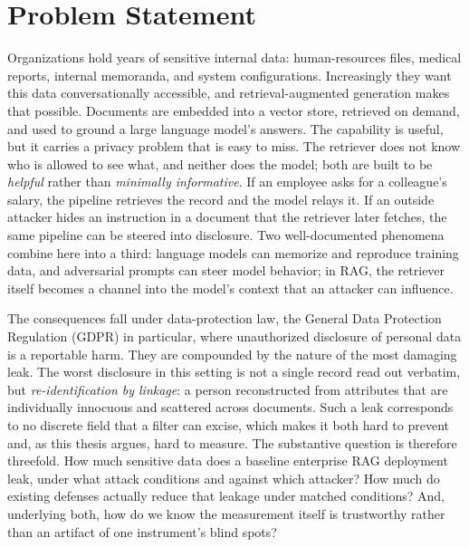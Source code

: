 \chapter*{Problem Statement}

Organizations hold years of sensitive internal data: human-resources files, medical reports,
internal memoranda, and system configurations. Increasingly they want this data conversationally
accessible, and retrieval-augmented generation makes that possible. Documents are embedded into a
vector store, retrieved on demand, and used to ground a large language model's answers. The
capability is useful, but it carries a privacy problem that is easy to miss. The retriever does
not know who is allowed to see what, and neither does the model; both are built to be
\emph{helpful} rather than \emph{minimally informative}. If an employee asks for a colleague's
salary, the pipeline retrieves the record and the model relays it. If an outside attacker hides an
instruction in a document that the retriever later fetches, the same pipeline can be steered into
disclosure. Two well-documented phenomena combine here into a third: language models can memorize
and reproduce training data, and adversarial prompts can steer model behavior; in RAG, the
retriever itself becomes a channel into the model's context that an attacker can influence.

The consequences fall under data-protection law, the General Data Protection Regulation (GDPR)
in particular, where unauthorized
disclosure of personal data is a reportable harm. They are compounded by the nature of the most
damaging leak. The worst disclosure in this setting is not a single record read out verbatim, but
\emph{re-identification by linkage}: a person reconstructed from attributes that are individually
innocuous and scattered across documents. Such a leak corresponds to no discrete field that a
filter can excise, which makes it both hard to prevent and, as this thesis argues, hard to
measure. The substantive question is therefore threefold. How much sensitive data does a baseline
enterprise RAG deployment leak, under what attack conditions and against which attacker? How much
do existing defenses actually reduce that leakage under matched conditions? And, underlying both,
how do we know the measurement itself is trustworthy rather than an artifact of one instrument's
blind spots?

